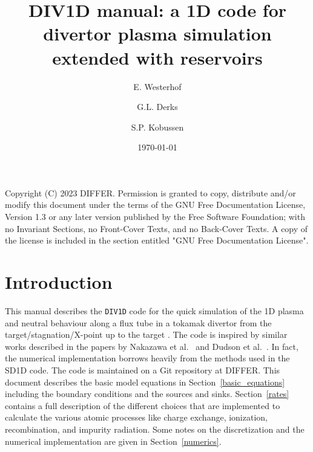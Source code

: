 \documentclass[amsmath,amssymb,a4]{revtex4-2}
\begin{document}
\title[DIV1D manual]{DIV1D manual: a 1D code for divertor plasma simulation \\ extended with reservoirs}

\author{E. Westerhof}
\author{G.L. Derks}
\author{S.P. Kobussen}
  

    
\address{DIFFER -- Dutch Institute for Fundamental Energy Research, PO Box 6336, 5600HH Eindhoven, The Netherlands, www.differ.nl}

\vspace{10pt}
\date\today




\maketitle

Copyright (C)  2023  DIFFER.
    Permission is granted to copy, distribute and/or modify this document
    under the terms of the GNU Free Documentation License, Version 1.3
    or any later version published by the Free Software Foundation;
    with no Invariant Sections, no Front-Cover Texts, and no Back-Cover Texts.
    A copy of the license is included in the section entitled "GNU
    Free Documentation License".
    
\section{Introduction}

This manual describes the {\tt DIV1D} code for the quick simulation of the 1D plasma and neutral behaviour along a flux tube in a tokamak divertor from the target/stagnation/X-point up to the target \cite{derks2025,kobussen2025,derks2024,poels2023,derks2022}. The code is inspired by similar works described in the papers by Nakazawa et al.~\cite{nakazawa2000} and Dudson et al.~\cite{dudson2019, SD1D}. In fact, the numerical implementation borrows heavily from the methods used in the SD1D code. The code is maintained on a Git repository at DIFFER. This document describes the basic model equations in Section~\ref{basic_equations} including the boundary conditions and the sources and sinks. Section~\ref{rates} contains a full description of the different choices that are implemented to calculate the various atomic processes like charge exchange, ionization, recombination, and impurity radiation. Some notes on the discretization and the numerical implementation are given in Section~\ref{numerics}.
\end{document}
